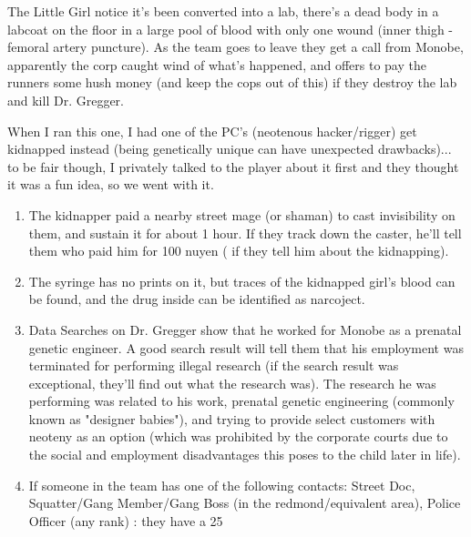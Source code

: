 \begin{scenario}{The Little Girl}
notice it's been converted into a lab, there's a dead body in a labcoat on the floor in a large pool of blood with only one wound (inner thigh - femoral artery puncture). As the team goes to leave they get a call from Monobe, apparently the corp caught wind of what's happened, and offers to pay the runners some hush money (and keep the cops out of this) if they destroy the lab and kill Dr. Gregger.

\notes When I ran this one, I had one of the PC's (neotenous hacker/rigger) get kidnapped instead (being genetically unique can have unexpected drawbacks)... to be fair though, I privately talked to the player about it first and they thought it was a fun idea, so we went with it.

\begin{enumerate}

\item The kidnapper paid a nearby street mage (or shaman) to cast invisibility on them, and sustain it for about 1 hour. If they track down the caster, he'll tell them who paid him for 100 nuyen ( if they tell him about the kidnapping).

\item The syringe has no prints on it, but traces of the kidnapped girl's blood can be found, and the drug inside can be identified as narcoject.

\item Data Searches on Dr. Gregger show that he worked for Monobe as a prenatal genetic engineer. A good search result will tell them that his employment was terminated for performing illegal research (if the search result was exceptional, they'll find out what the research was). The research he was performing was related to his work, prenatal genetic engineering (commonly known as "designer babies"), and trying to provide select customers with neoteny as an option (which was prohibited by the corporate courts due to the social and employment disadvantages this poses to the child later in life).

\item If someone in the team has one of the following contacts: Street Doc, Squatter/Gang Member/Gang Boss (in the redmond/equivalent area), Police Officer (any rank) : they have a 25%


\end{enumerate}
\end{scenario}
